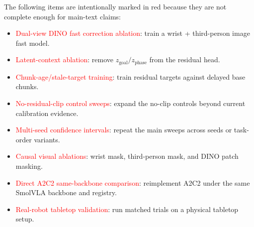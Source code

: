\documentclass[10pt]{article}
\newcommand{\smolvla}{SmolVLA}
\begin{document}
The following items are intentionally marked in red because they are not complete enough for main-text claims:
\begin{itemize}
  \item \textcolor{red}{Dual-view DINO fast correction ablation}: train a wrist + third-person image fast model.
  \item \textcolor{red}{Latent-context ablation}: remove $z_{\mathrm{goal}}/z_{\mathrm{phase}}$ from the residual head.
  \item \textcolor{red}{Chunk-age/stale-target training}: train residual targets against delayed base chunks.
  \item \textcolor{red}{No-residual-clip control sweeps}: expand the no-clip controls beyond current calibration evidence.
  \item \textcolor{red}{Multi-seed confidence intervals}: repeat the main sweeps across seeds or task-order variants.
  \item \textcolor{red}{Causal visual ablations}: wrist mask, third-person mask, and DINO patch masking.
  \item \textcolor{red}{Direct A2C2 same-backbone comparison}: reimplement A2C2 under the same \smolvla{} backbone and registry.
  \item \textcolor{red}{Real-robot tabletop validation}: run matched trials on a physical tabletop setup.
\end{itemize}



\end{document}
